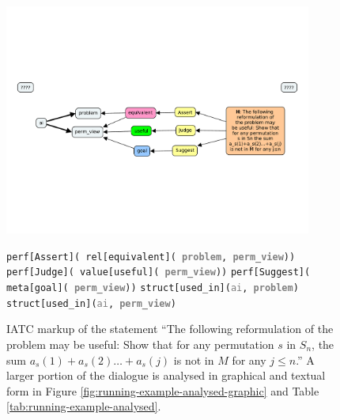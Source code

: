 \documentclass[smallextended,oneside]{svjour3}       %
\begin{document}
\begin{figure}[h]
\begin{center}
\includegraphics[trim=1.3cm 7cm 1mm 8.8cm,clip=true,width=0.9\textwidth]{QuickIATCexample}

\bigskip

\begin{minipage}{.8\textwidth}
\texttt{perf[\textcolor{perform}{Assert}](%
  rel[\textcolor{infer}{equivalent}](%
                   \textbf{\textcolor{gray}{problem}},
                   \textbf{\textcolor{gray}{perm\_view}}))}\newline
\texttt{perf[\textcolor{perform}{Judge}](%
       value[\textcolor{value}{useful}](%
       \textbf{\textcolor{gray}{perm\_view}}))}\newline
\texttt{perf[\textcolor{perform}{Suggest}](%
       meta[\textcolor{meta}{goal}](%
       \textbf{\textcolor{gray}{perm\_view}}))}\newline
\texttt{struct[used\_in](\textcolor{gray}{ai},
                        \textbf{\textcolor{gray}{problem}})}\newline
\texttt{struct[used\_in](\textcolor{gray}{ai},
                        \textbf{\textcolor{gray}{perm\_view}})}
\end{minipage}
\end{center}
\caption{IATC markup of the statement ``The following reformulation of the problem may be useful: Show that for any permutation $s$ in $S_n$, the sum $a_s(1)+a_s(2)\ldots +a_s(j)$ is not in $M$ for any $j\leq n$.''   A larger portion of the dialogue is analysed in graphical and textual form in Figure \ref{fig:running-example-analysed-graphic} and Table \ref{tab:running-example-analysed}. \label{fig:QuickIATCexample}}
\end{figure}
\end{document}
